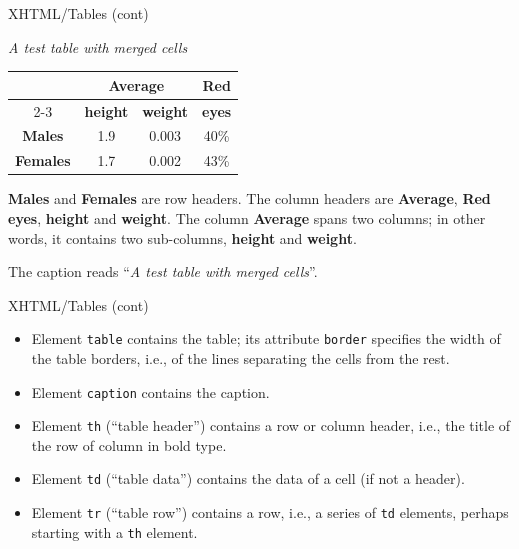 %
\begin{frame}{XHTML/Tables (cont)}

\begin{center}
\emph{A test table with merged cells}\\

\begin{tabular}{|c|c|c|c|}
\hline
                 & \multicolumn{2}{|c|}{\textbf{Average}} & \textbf{Red}\\
\cline{2-3}
                 & \textbf{height}    &   \textbf{weight} & \textbf{eyes}\\
\hline
\textbf{Males}   & 1.9                & 0.003             & 40\%\\
\hline
\textbf{Females} & 1.7                & 0.002             & 43\%\\
\hline
\end{tabular}
\end{center}
\textbf{Males} and \textbf{Females} are row headers. The column headers
are \textbf{Average}, \textbf{Red eyes}, \textbf{height} and
\textbf{weight}. The column \textbf{Average} spans two columns; in
other words, it contains two sub-columns, \textbf{height} and
\textbf{weight}.

The caption reads ``\emph{A test table with merged cells}''.

\end{frame}

%
\begin{frame}{XHTML/Tables (cont)}

\begin{itemize}

  \item Element \texttt{table} contains the table; its attribute
    \texttt{border} specifies the width of the table borders, i.e., of
    the lines separating the cells from the rest.

  \item Element \texttt{caption} contains the caption.

  \item Element \texttt{th} (``table header'') contains a row or
    column header, i.e., the title of the row of column in bold type.

  \item Element \texttt{td} (``table data'') contains the data of a
    cell (if not a header).

  \item Element \texttt{tr} (``table row'') contains a row, i.e., a
    series of \texttt{td} elements, perhaps starting with a
    \texttt{th} element.

\end{itemize}

\end{frame}


